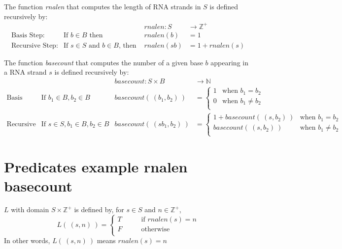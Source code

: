 \documentclass[12pt, oneside]{article}
\begin{document}
The function \textit{rnalen} that computes the length of RNA strands in $S$ is defined recursively by:
\[
\begin{array}{llll}
& & \textit{rnalen} : S & \to \mathbb{Z}^+ \\
\textrm{Basis Step:} & \textrm{If } b \in B\textrm{ then } & \textit{rnalen}(b) & = 1 \\
\textrm{Recursive Step:} & \textrm{If } s \in S\textrm{ and }b \in B\textrm{, then  } & \textit{rnalen}(sb) & = 1 + \textit{rnalen}(s)
\end{array}
\]

The function \textit{basecount} that computes the number of a given base 
$b$ appearing in a RNA strand $s$ is defined recursively by:
\[
\begin{array}{llll}
& & \textit{basecount} : S \times B & \to \mathbb{N} \\
\textrm{Basis Step:} &  \textrm{If } b_1 \in B, b_2 \in B & \textit{basecount}(~(b_1, b_2)~) & =
        \begin{cases}
            1 & \textrm{when } b_1 = b_2 \\
            0 & \textrm{when } b_1 \neq b_2 \\
        \end{cases} \\
\textrm{Recursive Step:} & \textrm{If } s \in S, b_1 \in B, b_2 \in B &\textit{basecount}(~(s b_1, b_2)~) & =
        \begin{cases}
            1 + \textit{basecount}(~(s, b_2)~) & \textrm{when } b_1 = b_2 \\
            \textit{basecount}(~(s, b_2)~) & \textrm{when } b_1 \neq b_2 \\
        \end{cases}
\end{array}
\] \vfill
\section*{Predicates example rnalen basecount}




$L$ with domain $S \times \mathbb{Z}^+$ is defined by, for $s \in S$ and $n \in \mathbb{Z}^+$,
\[
L( ~(s, n)~) = \begin{cases}
T &\qquad\text{if $rnalen(s) = n$}\\
F &\qquad\text{otherwise}\\
\end{cases}
\]
In other words, $L(~(s,n)~)$ means $rnalen(s) = n$
\end{document}
